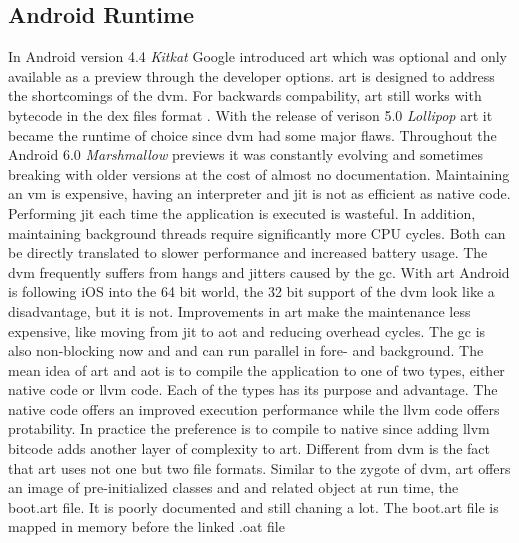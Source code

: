 \subsection{Android Runtime} \label{subsection:android-art}
In Android version 4.4 \textit{Kitkat} Google introduced \gls{art} which was optional and only available as a preview through the developer options.
\gls{art} is designed to address the shortcomings of the \gls{dvm}.
\newline
For backwards compability, \gls{art} still works with bytecode in the \gls{dex} files format \cite{androidArt}.
With the release of verison 5.0 \textit{Lollipop} \gls{art} it became the runtime of choice since \gls{dvm} had some major flaws.
Throughout the Android 6.0 \textit{Marshmallow} previews it was constantly evolving and sometimes breaking with older versions at the cost of almost no documentation.
\newline
Maintaining an \gls{vm} is expensive, having an interpreter and \gls{jit} is not as efficient as native code.
Performing \gls{jit} each time the application is executed is wasteful.
In addition, maintaining background threads require significantly more CPU cycles.
Both can be directly translated to slower performance and increased battery usage.
The \gls{dvm} frequently suffers from hangs and jitters caused by the \gls{gc}.
With \gls{art} Android is following iOS into the 64 bit world, the 32 bit support of the \gls{dvm} look like a disadvantage, but it is not.
\newline
Improvements in \gls{art} make the maintenance less expensive, like moving from \gls{jit} to \gls{aot} and reducing overhead cycles.
The \gls{gc} is also non-blocking now and and can run parallel in fore- and background.
\newline
The mean idea of \gls{art} and \gls{aot} is to compile the application to one of two types, either native code or \gls{llvm} code.
Each of the types has its purpose and advantage.
The native code offers an improved execution performance while the \gls{llvm} code offers protability.
In practice the preference is to compile to native since adding \gls{llvm} bitcode adds another layer of complexity to \gls{art}.
\newline
Different from \gls{dvm} is the fact that \gls{art} uses not one but two file formats.
Similar to the zygote of \gls{dvm}, \gls{art} offers an image of pre-initialized classes and and related object at run time, the boot.art file.
It is poorly documented and still chaning a lot.
The boot.art file is mapped in memory before the linked .oat file
